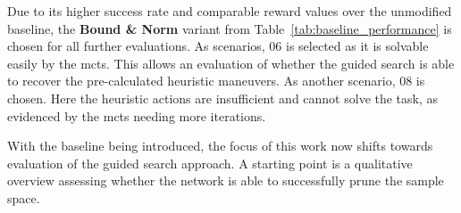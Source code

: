 Due to its higher success rate and comparable reward values over the unmodified baseline, the \textbf{Bound \& Norm} variant from Table~\ref{tab:baseline_performance} is chosen for all further evaluations. As scenarios, 06 is selected as it is solvable easily by the \gls{mcts}. This allows an evaluation of whether the guided search is able to recover the pre-calculated heuristic maneuvers. As another scenario, 08 is chosen. Here the heuristic actions are insufficient and cannot solve the task, as evidenced by the \gls{mcts} needing more iterations.

With the baseline being introduced, the focus of this work now shifts towards evaluation of the guided search approach. A starting point is a qualitative overview assessing whether the network is able to successfully prune the sample space.
\begin{landscape}
\begin{table}[h]
 \centering
\end{table}
\end{landscape}
